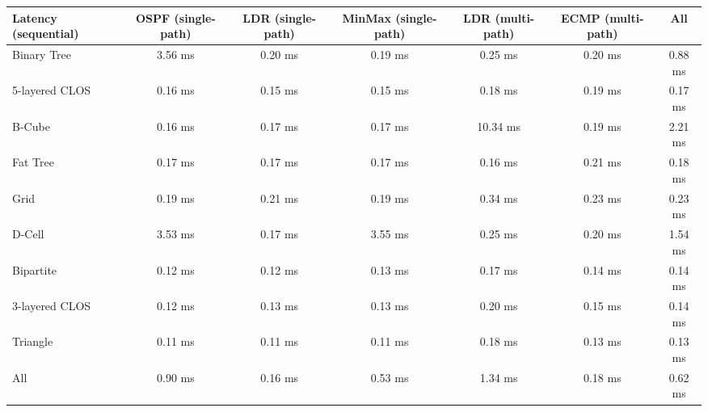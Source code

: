 \begin{tabular}{l|cccccc}
Latency (sequential) & OSPF (single-path) & LDR (single-path) & MinMax (single-path) & LDR (multi-path) & ECMP (multi-path) & All     \\
\hline
Binary Tree          & 3.56 ms            & 0.20 ms           & 0.19 ms              & 0.25 ms          & 0.20 ms           & 0.88 ms \\
5-layered CLOS       & 0.16 ms            & 0.15 ms           & 0.15 ms              & 0.18 ms          & 0.19 ms           & 0.17 ms \\
B-Cube               & 0.16 ms            & 0.17 ms           & 0.17 ms              & 10.34 ms         & 0.19 ms           & 2.21 ms \\
Fat Tree             & 0.17 ms            & 0.17 ms           & 0.17 ms              & 0.16 ms          & 0.21 ms           & 0.18 ms \\
Grid                 & 0.19 ms            & 0.21 ms           & 0.19 ms              & 0.34 ms          & 0.23 ms           & 0.23 ms \\
D-Cell               & 3.53 ms            & 0.17 ms           & 3.55 ms              & 0.25 ms          & 0.20 ms           & 1.54 ms \\
Bipartite            & 0.12 ms            & 0.12 ms           & 0.13 ms              & 0.17 ms          & 0.14 ms           & 0.14 ms \\
3-layered CLOS       & 0.12 ms            & 0.13 ms           & 0.13 ms              & 0.20 ms          & 0.15 ms           & 0.14 ms \\
Triangle             & 0.11 ms            & 0.11 ms           & 0.11 ms              & 0.18 ms          & 0.13 ms           & 0.13 ms \\
All                  & 0.90 ms            & 0.16 ms           & 0.53 ms              & 1.34 ms          & 0.18 ms           & 0.62 ms \\
\end{tabular}